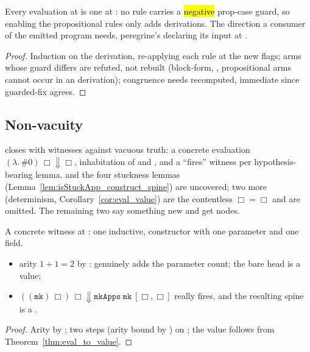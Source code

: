 \begin{proposition}
\label{prop:WcbvEval-propcase_weaken}
\leanok
{}
 Every evaluation at  is one at : no rule carries a \hl{negative} prop-case guard, so enabling the propositional rules only adds derivations.
 The direction a consumer of the emitted program needs, peregrine's  declaring its input at .
\end{proposition}
\begin{proof}
\leanok
{}
 Induction on the derivation, re-applying each rule at the new flags; arms whose guard differs are refuted, not rebuilt (block-form, , propositional arms cannot occur in an  derivation); congruence needs  recomputed, immediate since guarded-fix agrees.
\end{proof}

\subsection*{Non-vacuity}

 closes with witnesses against vacuous truth: a concrete evaluation $(\lambda.\,\#0)\,\Box \Downarrow \Box$, inhabitation of  and \WcbvEval{}, and a ``fires'' witness per hypothesis-bearing lemma.  and the four stuckness lemmas (Lemma~\ref{lem:isStuckApp_construct_spine}) are uncovered; two more (determinism, Corollary~\ref{cor:eval_value}) are the contentless $\Box=\Box$ and are omitted. The remaining two say something new and get nodes.

\begin{lemma}
\label{lem:construct_app_fires}
\leanok
{}
 A concrete witness at : one inductive, constructor  with one parameter and one field.
\begin{itemize}
\item arity $1+1=2$ by :  genuinely adds the parameter count; the bare head is a value;
\item $((\mathtt{mk})\,\Box)\,\Box \Downarrow \mathtt{mkApps}\ \mathtt{mk}\ [\Box,\Box]$ really fires, and the resulting spine is a .
\end{itemize}
\end{lemma}
\begin{proof}
\leanok
{}
 Arity by ; two  steps (arity bound by ) on ; the value follows from Theorem~\ref{thm:eval_to_value}.
\end{proof}


